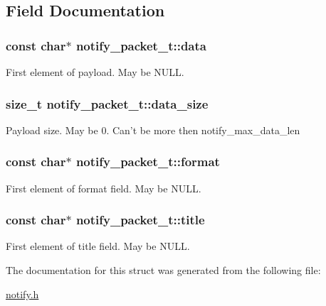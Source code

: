 \subsection{Field Documentation}
\hypertarget{structnotify__packet__t_ac51484fff834e9d17d734627fcfc21b4}{
\subsubsection[{data}]{\setlength{\rightskip}{0pt plus 5cm}const char$\ast$ notify\-\_\-packet\-\_\-t\-::data}}\label{structnotify__packet__t_ac51484fff834e9d17d734627fcfc21b4}


First element of payload. May be N\-U\-L\-L. 

\hypertarget{structnotify__packet__t_af6ee9fc97f52935b9c4887b856d115e8}{
\subsubsection[{data\-\_\-size}]{\setlength{\rightskip}{0pt plus 5cm}size\-\_\-t notify\-\_\-packet\-\_\-t\-::data\-\_\-size}}\label{structnotify__packet__t_af6ee9fc97f52935b9c4887b856d115e8}


Payload size. May be 0. Can't be more then {\ttfamily notify\-\_\-max\-\_\-data\-\_\-len} 

\hypertarget{structnotify__packet__t_a6bce6c2919cb2d7cceb74b024a52fe6f}{
\subsubsection[{format}]{\setlength{\rightskip}{0pt plus 5cm}const char$\ast$ notify\-\_\-packet\-\_\-t\-::format}}\label{structnotify__packet__t_a6bce6c2919cb2d7cceb74b024a52fe6f}


First element of {\ttfamily format} field. May be N\-U\-L\-L. 

\hypertarget{structnotify__packet__t_ad011adac6f55a105fcb8fd21823c98dd}{
\subsubsection[{title}]{\setlength{\rightskip}{0pt plus 5cm}const char$\ast$ notify\-\_\-packet\-\_\-t\-::title}}\label{structnotify__packet__t_ad011adac6f55a105fcb8fd21823c98dd}


First element of {\ttfamily title} field. May be N\-U\-L\-L. 



The documentation for this struct was generated from the following file\-:\begin{DoxyCompactItemize}
\item 
\hyperlink{notify_8h}{notify.\-h}\end{DoxyCompactItemize}
